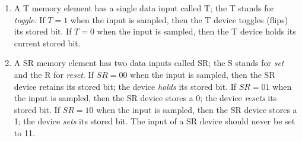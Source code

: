 \begin{enumerate}
\begin{enumerate}
            \item
                A T memory element has a single data input called T;
                the T stands for \textit{ toggle}.  If $T=1$ when the input
                is sampled, then the T device toggles (flips) its stored bit.
                If $T=0$ when the input is sampled, then the T device holds its
                current stored bit.

            \item
                A SR memory element has two data inputs called SR;
                the S stands for \textit{ set} and the R for \textit{ reset}.
                If $SR=00$ when the input is sampled, then the SR device retains
                its stored bit; the device \textit{ holds} its stored bit.
                If $SR=01$ when the input is sampled, then the SR device stores a 0;
                the device \textit{ resets} its stored bit.
                If $SR=10$ when the input is sampled, then the SR device stores a 1;
                the device \textit{ sets} its stored bit.
                The input of a SR device should never be set to 11.


\end{enumerate}
\end{enumerate}
